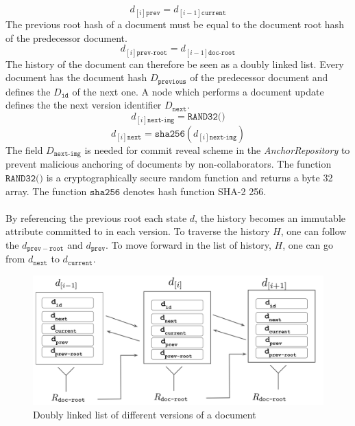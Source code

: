 \begin{equation}
d_{[i]\texttt{prev}} = d_{[i-1]\texttt{current}} 
\end{equation}
\newline
The previous root hash of a document must be equal to the document root hash of the predecessor document.
\begin{equation}
d_{[i]\texttt{prev-root}} = d_{[i-1]\texttt{doc-root}}
\end{equation}
\newline
The history of the document can therefore be seen as a doubly linked list. Every document has the document hash $D_{\texttt{previous}}$ of the predecessor document and defines the $D_{\texttt{id}}$ of the next one. A node which performs a document update defines the the next version identifier $D_{\texttt{next}}$.
\begin{equation}
d_{[i]\texttt{next-img}} = \texttt{RAND32()}
\end{equation}
\begin{equation}
d_{[i]\texttt{next}} = \mathtt{sha256}(d_{[i]\texttt{next-img}})
\end{equation}
\newline
The field $D_{\texttt{next-img}}$ is needed for commit reveal scheme in the \textit{AnchorRepository} to prevent malicious anchoring of documents by non-collaborators. The function $\texttt{RAND32()}$ is a cryptographically secure random function and returns a byte 32 array. The function $\mathtt{sha256}$ denotes hash function SHA-2 256.
\\\\By referencing the previous root each state $d$, the history becomes an immutable attribute committed to in each version. To traverse the history $H$, one can follow the $d_{\mathtt{prev-root}}$ and $d_{\mathtt{prev}}$. To move forward in the list of history, $H$, one can go from $d_{\mathtt{next}}$ to $d_{\mathtt{current}}$.
\begin{figure}[thpb]
  \centering
  \includegraphics[width=16cm]{img/documents-history-v2.png}
  \caption{Doubly linked list of different versions of a document} 
  \label{fig:documents}
\end{figure}

